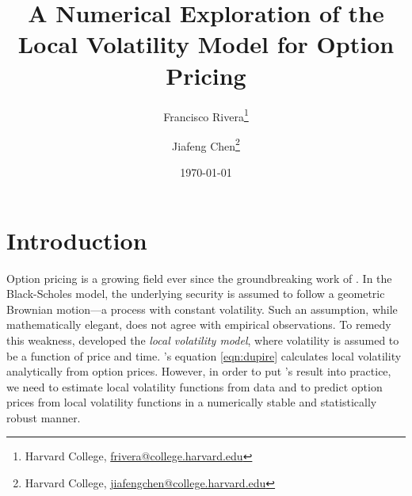\documentclass[11pt]{article}
\numberwithin{equation}{section}
\begin{document}
\title{A Numerical Exploration of the Local Volatility Model for Option Pricing}
\author{Francisco Rivera\thanks{Harvard College, 
\href{mailto:frivera@college.harvard.edu}{frivera@college.harvard.edu} 
} \and Jiafeng Chen\thanks{Harvard College,
\href{mailto:jiafengchen@college.harvard.edu}{jiafengchen@college.harvard.edu}}}
\date{\today}

\maketitle




\section{Introduction}

Option pricing is a growing field ever since the groundbreaking work of \cite{black1973pricing}. In the Black-Scholes model, the underlying security is assumed to follow a geometric Brownian motion---a process with constant volatility. Such an assumption, while mathematically elegant, does not agree with empirical observations. To remedy this weakness, \cite{dupire1997pricing} developed the \emph{local volatility model}, where volatility is assumed to be a function of price and time. \cite{dupire1997pricing}'s equation \eqref{eqn:dupire} calculates local volatility analytically from option prices. However, in order to put \cite{dupire1997pricing}'s result into practice, we need to estimate local volatility functions from data and to predict option prices from local volatility functions in a numerically stable and statistically robust manner.
\end{document}
